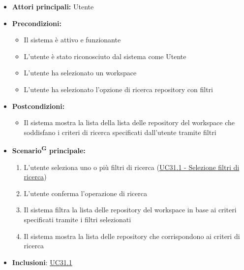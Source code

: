 \documentclass[a4paper, 11pt]{article}
\begin{document}
\begin{itemize}
	\item \textbf{Attori principali:} Utente
	\item \textbf{Precondizioni:} 
	\begin{itemize}
		\item Il sistema è attivo e funzionante
		\item L'utente è stato riconosciuto dal sistema come Utente
		\item L'utente ha selezionato un workspace
		\item L'utente ha selezionato l'opzione di ricerca repository con filtri
	\end{itemize}
	\item \textbf{Postcondizioni:} 
	\begin{itemize}
		\item Il sistema mostra la lista della lista delle repository del workspace che soddisfano i criteri di ricerca specificati dall'utente tramite filtri
	\end{itemize}
	\item \textbf{Scenario\textsuperscript{G} principale:}
	\begin{enumerate}
		\item L'utente seleziona uno o più filtri di ricerca (\hyperref[UC31.1]{UC31.1 - Selezione filtri di ricerca})
		\item L'utente conferma l'operazione di ricerca
		\item Il sistema filtra la lista delle repository del workspace in base ai criteri specificati tramite i filtri selezionati
		\item Il sistema mostra la lista delle repository che corrispondono ai criteri di ricerca
	\end{enumerate}
	\item \textbf{Inclusioni}: \hyperref[UC31.1]{UC31.1}
\end{itemize}
\end{document}
